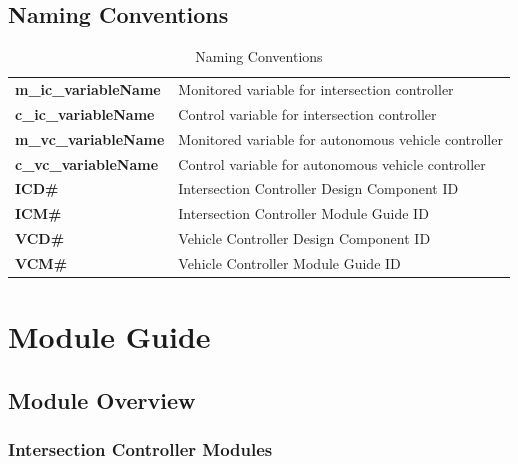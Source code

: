 \documentclass [10pt]{article}
\begin{document}
\subsection{Naming Conventions}
\begin{longtable}{ |p{ } p{ }|} \caption{Naming Conventions} \\ \hline

\textbf{m\_ic\_variableName} & Monitored variable for intersection controller \\ 

\cellcolor{tableCell}\textbf{c\_ic\_variableName}  & \cellcolor{tableCell}Control variable for intersection controller \\ 

\textbf{m\_vc\_variableName} & Monitored variable for autonomous vehicle controller \\ 

\cellcolor{tableCell}\textbf{c\_vc\_variableName}  & \cellcolor{tableCell}Control variable for autonomous vehicle controller \\ 

\textbf{ICD\#} & Intersection Controller Design Component ID \\ 

\cellcolor{tableCell}\textbf{ICM\#}  & \cellcolor{tableCell}Intersection Controller Module Guide ID \\

\textbf{VCD\#} & Vehicle Controller Design Component ID\\

\cellcolor{tableCell}\textbf{VCM\#}  & \cellcolor{tableCell}Vehicle Controller Module Guide ID \\\hline



\end{longtable}


\section{Module Guide}

\subsection{Module Overview}

\subsubsection{Intersection Controller Modules}
\end{document}
